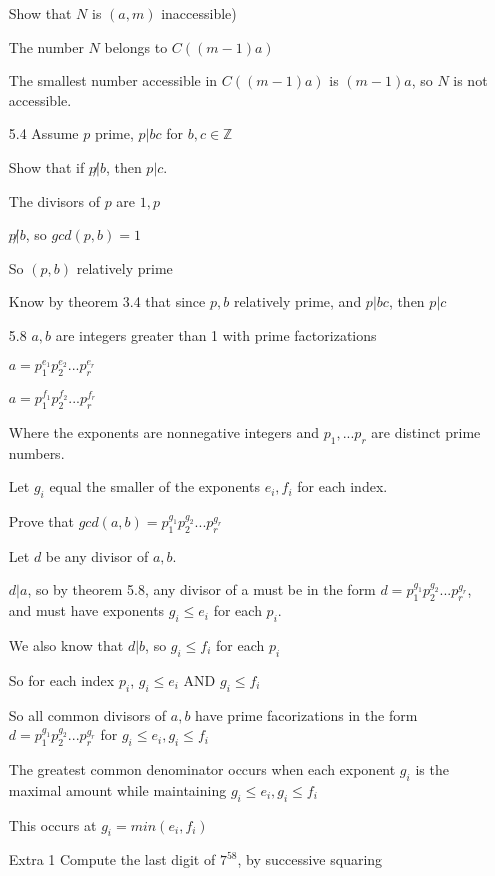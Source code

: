 \documentclass[11pt]{article}
\begin{document}
\begin{itemize}
Show that $N$ is $(a,m)$ inaccessible)

The number $N$ belongs to $C((m-1)a)$

The smallest number accessible in $C((m-1)a)$ is $(m-1)a$, so $N$ is not accessible.


\newpage

\item[5.4]
Assume $p$ prime, $p|bc$ for $b,c \in\mathbb{Z}$

Show that if $p\not |b$, then $p|c$.

The divisors of $p$ are $1, p$

$p\not | b$, so $gcd(p,b) = 1$

So $(p,b)$ relatively prime

Know by theorem 3.4 that since $p,b$ relatively prime, and $p|bc$, then $p|c$

\newpage

\item[5.8]
$a, b$ are integers greater than 1 with prime factorizations

$a = p_1^{e_1} p_2^{e_2}...p_r^{e_r}$

$a = p_1^{f_1} p_2^{f_2}...p_r^{f_r}$

Where the exponents are nonnegative integers and $p_1, ... p_r$ are distinct prime numbers.

Let $g_i$ equal the smaller of the exponents $e_i, f_i$ for each index.

Prove that $gcd(a,b) = p_1^{g_1} p_2^{g_2}... p_r^{g_r}$

Let $d$ be any divisor of $a,b$.

$d | a$, so by theorem 5.8, any divisor of a must be in the form $d = p_1^{g_1} p_2^{g_2} ... p_r^{g_r}$, and must have exponents $g_i \leq e_i$ for each $p_i$. 

We also know that $d | b$, so $g_i \leq f_i$ for each $p_i$

So for each index $p_i$, $g_i \leq e_i$ AND $g_i \leq f_i$

So all common divisors of $a,b$ have prime facorizations in the form $d = p_1^{g_1} p_2^{g_2} ... p_r^{g_r}$ for $g_i \leq e_i, g_i \leq f_i$

The greatest common denominator occurs when each exponent $g_i$ is the maximal amount while maintaining $g_i \leq e_i, g_i \leq f_i$

This occurs at $g_i = min(e_i, f_i)$

\newpage

\item[Extra 1]
Compute the last digit of $7^{58}$, by successive squaring


\end{itemize}
\end{document}
